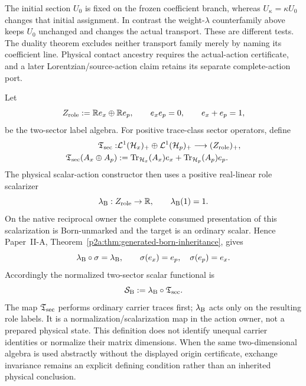 \documentclass[12pt,a4paper]{article}
\begin{document}
\begin{remark}
\label{p3b:rem:independent-response-atlas}
The initial section $U_0$ is fixed on the frozen coefficient branch, whereas
$U_\kappa=\kappa U_0$ changes that initial assignment. In contrast the
weight-$\lambda$ counterfamily above keeps $U_0$ unchanged and changes the
actual transport. These are different tests. The duality theorem excludes
neither transport family merely by naming its coefficient line. Physical
contact ancestry requires the actual-action certificate, and a later
Lorentzian/source-action claim retains its separate complete-action port.
\end{remark}

\begin{definition}
\label{p3b:def:sector-trace-born-state}
Let
\[
 Z_{\rm role}:=\mathbb R e_x\oplus\mathbb R e_p,
 \qquad
 e_xe_p=0,\qquad e_x+e_p=1,
\]
be the two-sector label algebra.  For positive trace-class sector operators,
define
\[
\begin{aligned}
 \mathfrak T_{\rm sec}:&
 \mathcal L^1(\mathcal H_x)_+
 \oplus\mathcal L^1(\mathcal H_p)_+
 \longrightarrow (Z_{\rm role})_+,\\
 \mathfrak T_{\rm sec}(A_x\oplus A_p)
 &:=
 \operatorname{Tr}_{\mathcal H_x}(A_x)e_x
 +\operatorname{Tr}_{\mathcal H_p}(A_p)e_p .
\end{aligned}
\]
The physical scalar-action constructor then uses a positive real-linear
role scalarizer
\[
 \lambda_{\rm B}:Z_{\rm role}\to\mathbb R,
 \qquad
 \lambda_{\rm B}(1)=1.
\]
On the native reciprocal owner the complete consumed presentation of this
scalarization is Born-unmarked and the target is an ordinary scalar.  Hence
Paper~II-A, Theorem~\ref{p2a:thm:generated-born-inheritance}, gives
\[
 \lambda_{\rm B}\circ\sigma=\lambda_{\rm B},
 \qquad
 \sigma(e_x)=e_p,\quad \sigma(e_p)=e_x.
\]
Accordingly the normalized two-sector scalar functional is
\[
 \mathcal S_{\rm B}
 :=\lambda_{\rm B}\circ\mathfrak T_{\rm sec}.
\]
The map \(\mathfrak T_{\rm sec}\) performs ordinary carrier traces first;
\(\lambda_{\rm B}\) acts only on the resulting role labels.  It is a
normalization/scalarization map in the action owner, not a prepared physical
state.  This definition does not identify unequal carrier identities or
normalize their matrix dimensions.  When the same two-dimensional algebra is
used abstractly without the displayed origin certificate, exchange invariance
remains an explicit defining condition rather than an inherited physical
conclusion.
\end{definition}
\end{document}
